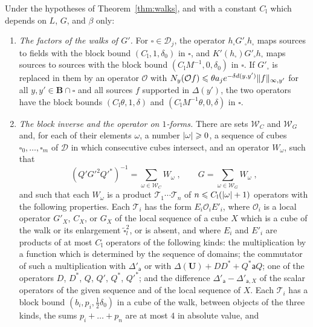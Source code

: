 \documentclass[11pt]{preprint}
\DeclarePairedDelimiter{\abs}{\lvert}{\rvert}
\DeclarePairedDelimiter{\norm}{\lVert}{\rVert}
\numberwithin{equation}{section}
\begin{document}
\begin{theorem}\label{thm:walk-structure}
Under the hypotheses of Theorem~\ref{thm:walks}, and with a constant $C_{\mathrm l}$ which depends on $L$, $G$, and $\beta$ only:
\begin{enumerate}[label=(\roman*)]
\item \emph{The factors of the walks of $G'$.} For $\square \in \mathscr D_j$, the operator $h_\square G'_\square h_\square$ maps sources to fields with the block bound $(C_{\mathrm l}, 1, \delta_0)$ in $\square$, and $K'(h_\square)G'_\square h_\square$ maps sources to sources with the block bound $(C_{\mathrm l}M^{-1}, 0, \delta_0)$ in $\square$. If $G'_\square$ is replaced in them by an operator $\mathcal O$ with $N_y(\mathcal Of) \leqslant \theta a_je^{-\delta d(y, y')}\norm f_{\infty,y'}$ for all $y, y' \in \mathbf B \cap \square$ and all sources $f$ supported in $\Delta(y')$, the two operators have the block bounds $(C_{\mathrm l}\theta, 1, \delta)$ and $(C_{\mathrm l}M^{-1}\theta, 0, \delta)$ in $\square$.
\item \emph{The block inverse and the operator on $1$-forms.} There are sets $\mathscr W_C$ and $\mathscr W_G$ and, for each of their elements $\omega$, a number $\abs\omega \geqslant 0$, a sequence of cubes $\square_0, \dots, \square_m$ of $\mathscr D$ in which consecutive cubes intersect, and an operator $W_\omega$, such that
\begin{equation}\label{eq:walk-expansions}
    (Q'G'^2Q'^*)^{-1} = \sum_{\omega \in \mathscr W_C}W_\omega\;,
    \qquad
    G = \sum_{\omega \in \mathscr W_G}W_\omega\;,
\end{equation}
and such that each $W_\omega$ is a product $\mathcal T_1\cdots\mathcal T_n$ of $n \leqslant C_{\mathrm l}(\abs\omega + 1)$ operators with the following properties. Each $\mathcal T_i$ has the form $E_i\mathcal O_iE'_i$, where $\mathcal O_i$ is a local operator $G'_X$, $C_X$, or $G_X$ of the local sequence of a cube $X$ which is a cube of the walk or its enlargement $\tilde\square_l^2$, or is absent, and where $E_i$ and $E'_i$ are products of at most $C_{\mathrm l}$ operators of the following kinds: the multiplication by a function which is determined by the sequence of domains; the commutator of such a multiplication with $\Delta'_{\mathsf a}$ or with $\Delta(\mathbf U) + DD^* + Q^*\mathsf aQ$; one of the operators $D$, $D^*$, $Q$, $Q'$, $Q^*$, $Q'^*$; and the difference $\Delta'_{\mathsf a} - \Delta'_{\mathsf a,X}$ of the scalar operators of the given sequence and of the local sequence of $X$. Each $\mathcal T_i$ has a block bound $(b_i, p_i, \frac{1}{2}\delta_0)$ in a cube of the walk, between objects of the three kinds, the sums $p_i + \dots + p_n$ are at most $4$ in absolute value, and

\end{enumerate}
\end{theorem}
\end{document}
